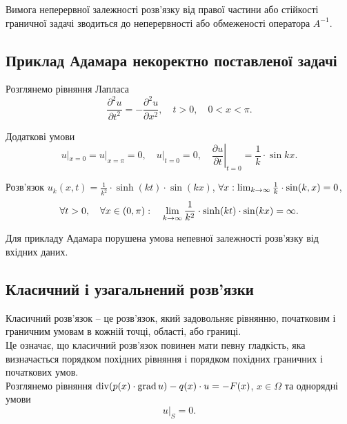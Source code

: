 Вимога неперервної залежності розв'язку від правої частини або стійкості граничної задачі зводиться до неперервності або обмеженості оператора $A^{-1}$.

\subsection{Приклад Адамара некоректно поставленої задачі}

Розглянемо рівняння Лапласа
\begin{equation}
	\label{eq:8.21}
	\frac{\partial^2 u}{\partial t^2} = - \frac{\partial^2 u}{\partial x^2}, \quad t > 0, \quad 0 < x < \pi.
\end{equation}

Додаткові умови
\begin{equation}
	\label{eq:8.22}
	u|_{x = 0} = u|_{x = \pi} = 0, \quad u|_{t = 0} = 0, \quad \left. \frac{\partial u}{\partial t} \right|_{t = 0} = \frac{1}{k} \cdot \sin k x.
\end{equation}

Розв'язок $u_k(x, t) = \frac{1}{k^2} \cdot \sinh (k t) \cdot \sin (k x)$, $\forall x: \operatorname*{lim}_{k \to \infty} \frac{1}{k} \cdot \sin(k, x) = 0$, 
\begin{equation*}
	\forall t > 0, \quad \forall x \in (0, \pi): \quad \operatorname*{lim}_{k \to \infty} \frac{1}{k^2} \cdot \sinh (k t) \cdot \sin (k x) = \infty.
\end{equation*}

Для прикладу Адамара порушена умова непевної залежності розв'язку від вхідних даних.

\subsection{Класичний і узагальнений розв'язки}

Класичний розв'язок -- це розв'язок, який задовольняє рівнянню, початковим і граничним умовам в кожній точці, області, або границі. \\

Це означає, що класичний розв'язок повинен мати певну гладкість, яка визначається порядком похідних рівняння і порядком похідних граничних і початкових умов. \\

Розглянемо рівняння $\operatorname{div} (p(x) \cdot \operatorname{grad} u) - q(x) \cdot u = - F(x)$, $x \in \Omega$ та однорядні умови 
\begin{equation}
	\label{eq:8.23}
	u|_S = 0.
\end{equation}

